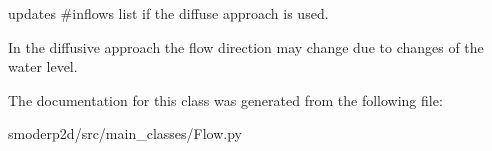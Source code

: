 updates \#inflows list if the diffuse approach is used. 

In the diffusive approach the flow direction may change due to changes of the water level. 

The documentation for this class was generated from the following file\-:\begin{DoxyCompactItemize}
\item 
smoderp2d/src/main\-\_\-classes/Flow.\-py\end{DoxyCompactItemize}
